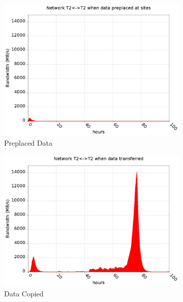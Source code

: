 \documentclass[a4paper]{jpconf}
\begin{document}
\begin{figure}
  \centering
  \begin{subfigure}{0.3\textwidth}
    \includegraphics[width=\textwidth]{figures/T_FP0_RP0DataT2.png}
    \caption{Preplaced Data\label{fig:tier2Today}}
  \end{subfigure}
  \begin{subfigure}{0.3\textwidth}
    \includegraphics[width=\textwidth]{figures/S_FP0_RP0DataT2.png}
    \caption{Data Copied\label{fig:tier2Copy}}
  \end{subfigure}
  \begin{subfigure}{0.3\textwidth}

\end{subfigure}
\end{figure}
\end{document}
